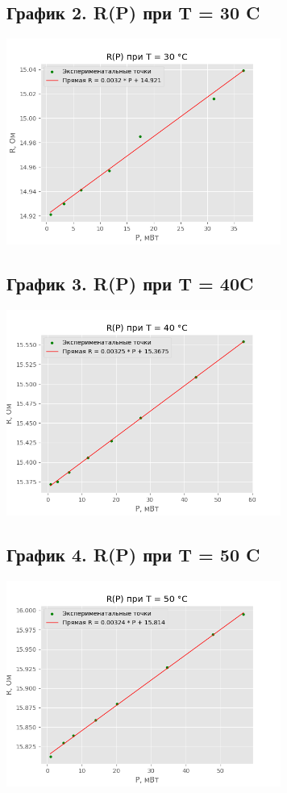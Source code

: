 \documentclass[15pt,a5paper,reqno]{article}
\begin{document}
    \subsection{График 2. R(P) при T = 30 \degree C}
    \begin{center}
        \centering
        \includegraphics[width = 9cm]{30.png}
    \end{center}
    
    \newpage
    \subsection{График 3. R(P) при T = 40\degree C}
    \begin{center}
        \centering
        \includegraphics[width = 9cm]{40.png}
    \end{center}
    
    \subsection{График 4. R(P) при T = 50 \degree C}
    \begin{center}
        \centering
        \includegraphics[width = 9cm]{50.png}
    \end{center}
    
\end{document}
